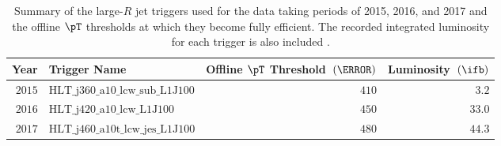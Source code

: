 \begin{table}[htpb]
 \centering 
  \caption{ Summary of the large-$R$ jet triggers used for the data taking
periods of 2015, 2016, and 2017 and the offline $\pT$ thresholds at which
they become fully efficient. The recorded integrated luminosity for each
trigger is also included \cite{Krizka:2310645}.}
 \begin{tabular}{@{}rlrr@{}}
  \toprule
  Year   & Trigger Name                 & Offline $\pT$ Threshold~$(\GeV)$ & Luminosity~$\left(\ifb\right)$ \\ \midrule
  $2015$ & $\text{HLT\_j360\_a10\_lcw\_sub\_L1J100}$  & $410$                              & $3.2$                          \\
  $2016$ & $\text{HLT\_j420\_a10\_lcw\_L1J100}$      & $450$                              & $33.0$                         \\
  $2017$ & $\text{HLT\_j460\_a10t\_lcw\_jes\_L1J100}$ & $480$                              & $44.3$                         \\
  \bottomrule
 \end{tabular}
 \label{table:triggers}
\end{table}
